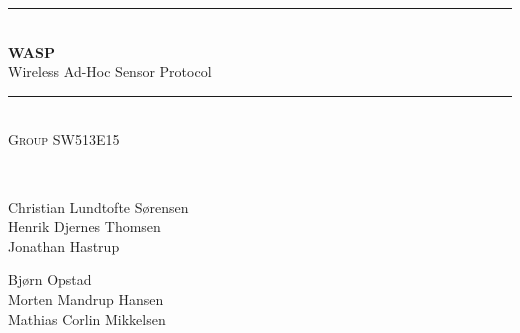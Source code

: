 \documentclass[pdftex,12pt,a4paper]{report}
\newcommand{\HRule}{\rule{\linewidth}{0.5mm}}
\begin{document}
\begin{titlepage}
\begin{center}


\HRule \\[0.4cm]
{ \huge{\bfseries WASP}\\ Wireless Ad-Hoc Sensor Protocol\\[0.4cm] }

\HRule \\[1.5cm]

\textsc{Group SW513E15}

\begin{figure}[!h]
	\centering
\end{figure}

\textsc{\Large }\\[0.5cm]

\begin{minipage}{0.46\textwidth}
\begin{flushleft} \large
Christian Lundtofte Sørensen\\
Henrik Djernes Thomsen\\
Jonathan Hastrup\\
\end{flushleft}
\end{minipage}
\begin{minipage}{0.45\textwidth}
\begin{flushright} \large
Bjørn Opstad\\
Morten Mandrup Hansen\\
Mathias Corlin Mikkelsen
\end{flushright}
\end{minipage}

\vfill

\end{center}
\end{titlepage}
\end{document}
